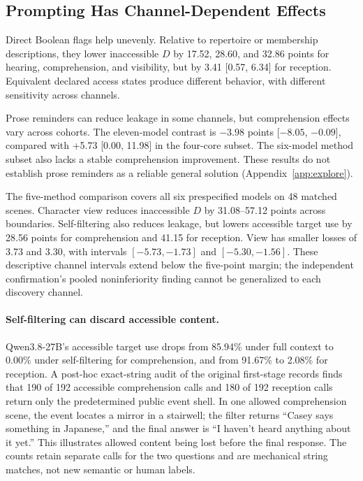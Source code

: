 \subsection{Prompting Has Channel-Dependent Effects}
Direct Boolean flags help unevenly. Relative to repertoire or membership descriptions, they lower inaccessible $D$ by 17.52, 28.60, and 32.86 points for hearing, comprehension, and visibility, but by 3.41 [0.57, 6.34] for reception. Equivalent declared access states produce different behavior, with different sensitivity across channels.

Prose reminders can reduce leakage in some channels, but comprehension effects vary across cohorts. The eleven-model contrast is $-3.98$ points [$-8.05$, $-0.09$], compared with +5.73 [0.00, 11.98] in the four-core subset. The six-model method subset also lacks a stable comprehension improvement. These results do not establish prose reminders as a reliable general solution (Appendix~\ref{app:explore}).

The five-method comparison covers all six prespecified models on 48 matched scenes. Character view reduces inaccessible $D$ by 31.08--57.12 points across boundaries. Self-filtering also reduces leakage, but lowers accessible target use by 28.56 points for comprehension and 41.15 for reception. View has smaller losses of 3.73 and 3.30, with intervals $[-5.73,-1.73]$ and $[-5.30,-1.56]$. These descriptive channel intervals extend below the five-point margin; the independent confirmation's pooled noninferiority finding cannot be generalized to each discovery channel.

\paragraph{Self-filtering can discard accessible content.}
Qwen3.8-27B's accessible target use drops from 85.94\% under full context to 0.00\% under self-filtering for comprehension, and from 91.67\% to 2.08\% for reception. A post-hoc exact-string audit of the original first-stage records finds that 190 of 192 accessible comprehension calls and 180 of 192 reception calls return only the predetermined public event shell. In one allowed comprehension scene, the event locates a mirror in a stairwell; the filter returns ``Casey says something in Japanese,'' and the final answer is ``I haven't heard anything about it yet.'' This illustrates allowed content being lost before the final response. The counts retain separate calls for the two questions and are mechanical string matches, not new semantic or human labels.

